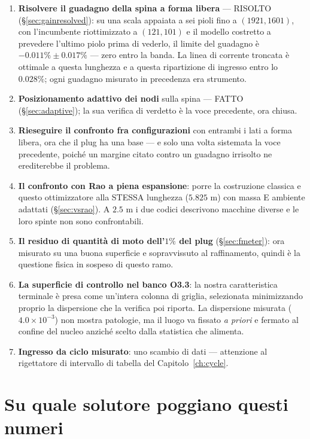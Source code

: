 \begin{enumerate}[itemsep=2pt]
\item \textbf{Risolvere il guadagno della spina a forma libera} ---
  RISOLTO (\S\ref{sec:gainresolved}): su una scala appaiata a sei
  pioli fino a $(1921,1601)$, con l'incumbente riottimizzato a
  $(121,101)$ e il modello costretto a prevedere l'ultimo piolo prima
  di vederlo, il limite del guadagno è
  $-0.011\% \pm 0.017\%$ --- zero entro la banda. La linea di corrente
  troncata è ottimale a questa lunghezza e a questa ripartizione di
  ingresso entro lo $0.028\%$; ogni guadagno misurato in precedenza
  era strumento.
\item \textbf{Posizionamento adattivo dei nodi} sulla spina --- FATTO
  (\S\ref{sec:adaptive}); la sua verifica di verdetto è la voce
  precedente, ora chiusa.
\item \textbf{Rieseguire il confronto fra configurazioni} con
  entrambi i lati a forma libera, ora che il plug ha una base --- e
  solo una volta sistemata la voce precedente, poiché un margine
  citato contro un guadagno irrisolto ne erediterebbe il problema.
\item \textbf{Il confronto con Rao a piena espansione}: porre la
  costruzione classica e questo ottimizzatore alla STESSA lunghezza
  ($5.825$ m) con massa E ambiente adattati (\S\ref{sec:vsrao}). A
  $2.5$ m i due codici descrivono macchine diverse e le loro spinte
  non sono confrontabili.
\item \textbf{Il residuo di quantità di moto dell'$1\%$ del plug}
  (\S\ref{sec:fmeter}): ora misurato su una buona superficie e
  sopravvissuto al raffinamento, quindi è la questione fisica in
  sospeso di questo ramo.
\item \textbf{La superficie di controllo nel banco O3.3}: la nostra
  caratteristica terminale è presa come un'intera colonna di griglia,
  selezionata minimizzando proprio la dispersione che la verifica poi
  riporta. La dispersione misurata ($4.0\times10^{-3}$) non mostra
  patologie, ma il luogo va fissato \emph{a priori} e fermato al
  confine del nucleo anziché scelto dalla statistica che alimenta.
\item \textbf{Ingresso da ciclo misurato}: uno scambio di dati ---
  attenzione al rigettatore di intervallo di tabella del
  Capitolo~\ref{ch:cycle}.
\end{enumerate}

\section{Su quale solutore poggiano questi numeri}
\label{sec:rebase}

